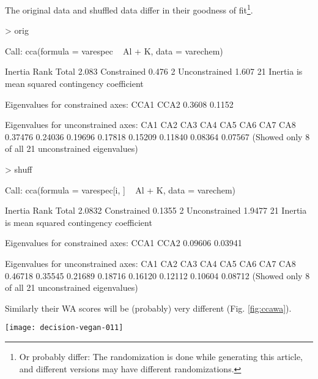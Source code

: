 \documentclass[a4paper,10pt]{amsart}
\begin{document}
The original data and shuffled data differ in their goodness of
fit\footnote{Or probably differ: The randomization is done while
generating this article, and different versions may have different
randomizations.}.
\begin{Schunk}
\begin{Sinput}
> orig
\end{Sinput}
\begin{Soutput}
Call:
cca(formula = varespec ~ Al + K, data = varechem) 

              Inertia Rank
Total           2.083     
Constrained     0.476    2
Unconstrained   1.607   21
Inertia is mean squared contingency coefficient 

Eigenvalues for constrained axes:
  CCA1   CCA2 
0.3608 0.1152 

Eigenvalues for unconstrained axes:
    CA1     CA2     CA3     CA4     CA5     CA6     CA7     CA8 
0.37476 0.24036 0.19696 0.17818 0.15209 0.11840 0.08364 0.07567 
(Showed only 8 of all 21 unconstrained eigenvalues)
\end{Soutput}
\begin{Sinput}
> shuff
\end{Sinput}
\begin{Soutput}
Call:
cca(formula = varespec[i, ] ~ Al + K, data = varechem) 

              Inertia Rank
Total          2.0832     
Constrained    0.1355    2
Unconstrained  1.9477   21
Inertia is mean squared contingency coefficient 

Eigenvalues for constrained axes:
   CCA1    CCA2 
0.09606 0.03941 

Eigenvalues for unconstrained axes:
    CA1     CA2     CA3     CA4     CA5     CA6     CA7     CA8 
0.46718 0.35545 0.21689 0.18716 0.16120 0.12112 0.10604 0.08712 
(Showed only 8 of all 21 unconstrained eigenvalues)
\end{Soutput}
\end{Schunk}
Similarly their WA scores will be (probably) very different
(Fig. \ref{fig:ccawa}).
\begin{SCfigure}
\texttt{[image: decision-vegan-011]}
\caption{Procrustes rotation of WA scores of CCA with the original and
  shuffled data.}
\label{fig:ccawa}
\end{SCfigure}
\end{document}
